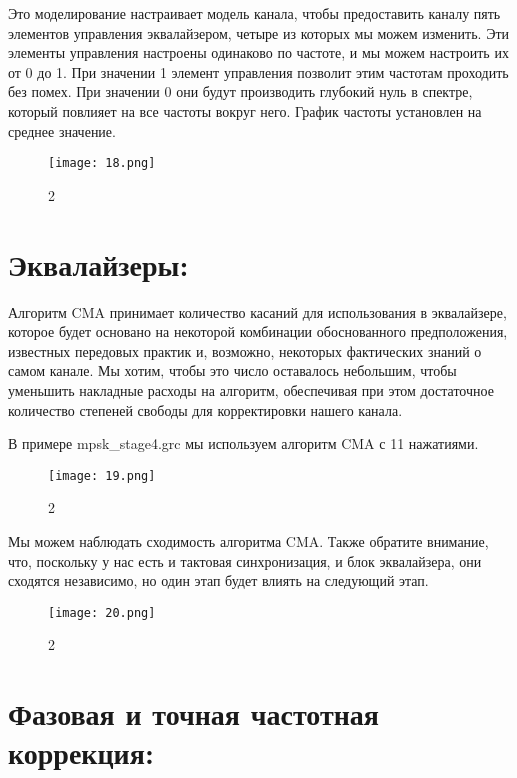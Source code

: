 \documentclass[10pt,a4paper,oneside]{article}
\begin{document}
Это моделирование настраивает модель канала, чтобы предоставить каналу пять элементов управления эквалайзером, четыре из которых мы можем изменить. Эти элементы управления настроены одинаково по частоте, и мы можем настроить их от 0 до 1. При значении 1 элемент управления позволит этим частотам проходить без помех. При значении 0 они будут производить глубокий нуль в спектре, который повлияет на все частоты вокруг него. График частоты установлен на среднее значение.

\begin{figure}[H]
        \centering
        \texttt{[image: 18.png]}
        \caption{2}
        \label{fig:first}
\end{figure}

\section{Эквалайзеры:}

Алгоритм CMA принимает количество касаний для использования в эквалайзере, которое будет основано на некоторой комбинации обоснованного предположения, известных передовых практик и, возможно, некоторых фактических знаний о самом канале. Мы хотим, чтобы это число оставалось небольшим, чтобы уменьшить накладные расходы на алгоритм, обеспечивая при этом достаточное количество степеней свободы для корректировки нашего канала.

В примере mpsk_stage4.grc мы используем алгоритм CMA с 11 нажатиями.

\begin{figure}[H]
        \centering
        \texttt{[image: 19.png]}
        \caption{2}
        \label{fig:first}
\end{figure}

Мы можем наблюдать сходимость алгоритма CMA. Также обратите внимание, что, поскольку у нас есть и тактовая синхронизация, и блок эквалайзера, они сходятся независимо, но один этап будет влиять на следующий этап.

\begin{figure}[H]
        \centering
        \texttt{[image: 20.png]}
        \caption{2}
        \label{fig:first}
\end{figure}

\section{Фазовая и точная частотная коррекция:}
\end{document}
